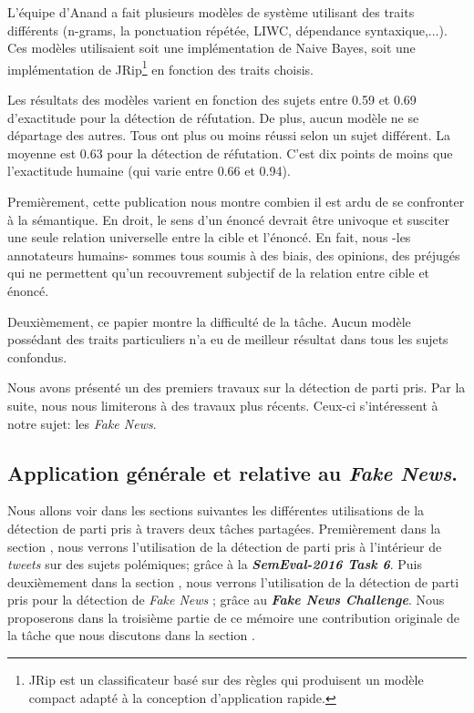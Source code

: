 \documentclass[onecolumn, 12pt]{article}
\begin{document}
L'équipe d'Anand a fait plusieurs modèles de système utilisant des traits différents (n-grams, la ponctuation répétée, LIWC, dépendance syntaxique,...).
Ces modèles utilisaient soit une implémentation de Naive Bayes, soit une implémentation de JRip\footnote{JRip est un classificateur basé sur des règles qui produisent un modèle compact adapté à la conception d'application rapide.} en fonction des traits choisis.

Les résultats des modèles varient en fonction des sujets entre 0.59 et 0.69 d'exactitude pour la détection de réfutation.
De plus, aucun modèle ne se départage des autres.
Tous ont plus ou moins réussi selon un sujet différent.
La moyenne est 0.63 pour la détection de réfutation.
C'est dix points de moins que l'exactitude humaine (qui varie entre 0.66 et 0.94).

Premièrement, cette publication nous montre combien il est ardu de se confronter à la sémantique.
En droit, le sens d'un énoncé devrait être univoque et susciter une seule relation universelle entre la cible et l'énoncé.
En fait, nous -les annotateurs humains- sommes tous soumis à des biais, des opinions, des préjugés qui ne permettent qu'un recouvrement subjectif de la relation entre cible et énoncé.

Deuxièmement, ce papier montre la difficulté de la tâche.
Aucun modèle possédant des traits particuliers n'a eu de meilleur résultat dans tous les sujets confondus.

Nous avons présenté un des premiers travaux sur la détection de parti pris.
Par la suite, nous nous limiterons à des travaux plus récents.
Ceux-ci s'intéressent à notre sujet: les \textit{Fake News}.

\subsection{Application générale et relative au \textit{Fake News}.}
Nous allons voir dans les sections suivantes les différentes utilisations de la détection de parti pris à travers deux tâches partagées.
Premièrement dans la section , nous verrons l'utilisation de la détection de parti pris à l'intérieur de \textit{tweets} sur des sujets polémiques; grâce à la \textbf{\textit{SemEval-2016 Task 6}}.
Puis deuxièmement dans la section , nous verrons l'utilisation de la détection de parti pris pour la détection de \textit{Fake News} ; grâce au \textbf{\textit{Fake News Challenge}}.
Nous proposerons dans la troisième partie de ce mémoire une contribution originale de la tâche que nous discutons dans la section .
\end{document}
